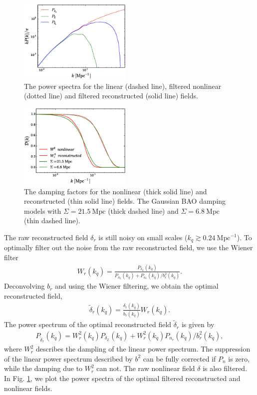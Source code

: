 \documentclass[aps,prd,twocolumn,showpacs,superscriptaddress,groupedaddress,nofootinbib]{revtex4}  %
\newcommand{\mr}{\mathrm}
\newcommand{\bea}{\begin{eqnarray}}
\newcommand{\eea}{\end{eqnarray}}
\begin{document}
\begin{figure}[tbp]
\begin{center}
\includegraphics[width=0.48\textwidth]{f5.eps}
\end{center}
\vspace{-0.7cm}
\caption{The power spectra for the linear (dashed line), filtered nonlinear
(dotted line) and filtered reconstructed (solid line) fields.}
\label{fig:wf}
\end{figure}

\begin{figure}[tbp]
\begin{center}
\includegraphics[width=0.48\textwidth]{f6x.eps}
\end{center}
\vspace{-0.7cm}
\caption{The damping factors for the nonlinear (thick solid line) and 
reconstructed (thin solid line) fields. The Gaussian BAO damping models with 
$\Sigma=21.5\ \mr{Mpc}$ (thick dashed line) and $\Sigma=6.8\ \mr{Mpc}$ 
(thin dashed line).}
\label{fig:damp}
\end{figure}

The raw reconstructed field $\delta_r$ is still noisy on small scales 
($k_q\gtrsim0.24\ \mr{Mpc}^{-1}$). To optimally filter out the noise from the 
raw reconstructed field, we use the Wiener filter
\bea
W_r(k_q)=\frac{P_{\delta_L}(k_q)}{P_{\delta_L}(k_q)+P_{n_r}(k_q)/b_r^2(k_q)}.
\eea
Deconvolving $b_r$ and using the Wiener filtering, we obtain the optimal 
reconstructed field,
\bea
\tilde{\delta}_r(k_q)=\frac{\delta_r(k_q)}{b_r(k_q)}W_r(k_q).
\eea
The power spectrum of the optimal reconstructed field $\tilde{\delta}_r$ is 
given by
\bea
P_{\tilde{\delta}_r}(k_q)=W_r^2(k_q)P_{\delta_L}(k_q)+W_r^2(k_q)
{P_{n_r}(k_q)}/{b_r^2(k_q)},
\eea
where $W_r^2$ describes the dampling of the linear power spectrum. 
The suppression of the linear power spectrum described by $b^2$ can be fully 
corrected if $P_n$ is zero, while the damping due to $W_r^2$ can not.
The raw 
nonlinear field $\delta$ is also filtered. 
In Fig. \ref{fig:wf}, we plot the power spectra of the optimal filtered 
reconstructed and nonlinear fields.
\end{document}
